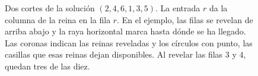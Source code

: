\begin{figure}[htbp]
\centering
{}
\caption{Dos cortes de la solución \((2,4,6,1,3,5)\). La entrada \(r\) da la columna de la reina
en la fila \(r\). En el ejemplo, las filas se revelan de arriba abajo y la raya horizontal marca hasta dónde
se ha llegado. Las coronas indican las reinas reveladas y los círculos con punto, las casillas
que esas reinas dejan disponibles. Al revelar las filas \(3\) y \(4\), quedan tres de las diez.}
\label{fig:cortes}
\end{figure}
